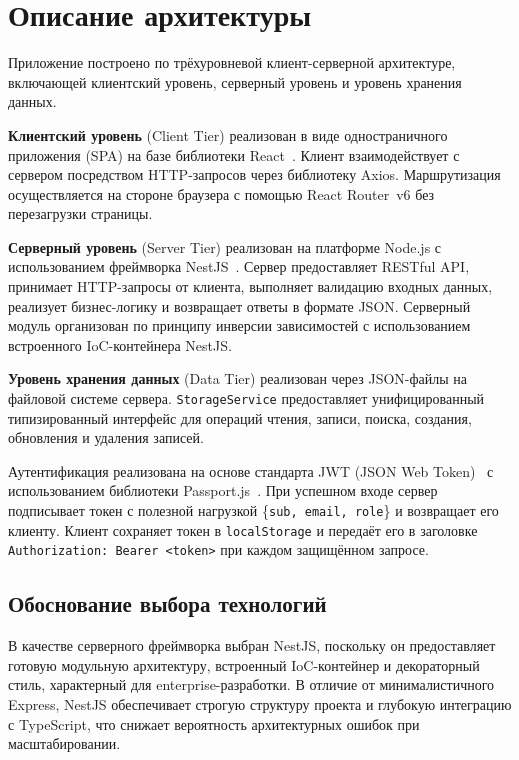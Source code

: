 \documentclass[14pt,a4paper]{extarticle}
\begin{document}
\newpage

\section{Описание архитектуры}

Приложение построено по трёхуровневой клиент-серверной архитектуре, включающей клиентский уровень, серверный уровень и уровень хранения данных.

\textbf{Клиентский уровень} (Client Tier) реализован в виде одностраничного приложения (SPA) на базе библиотеки React~\cite{react}. Клиент взаимодействует с сервером посредством HTTP-запросов через библиотеку Axios. Маршрутизация осуществляется на стороне браузера с помощью React Router~v6 без перезагрузки страницы.

\textbf{Серверный уровень} (Server Tier) реализован на платформе Node.js с использованием фреймворка NestJS~\cite{nestjs}. Сервер предоставляет RESTful API, принимает HTTP-запросы от клиента, выполняет валидацию входных данных, реализует бизнес-логику и возвращает ответы в формате JSON. Серверный модуль организован по принципу инверсии зависимостей с использованием встроенного IoC-контейнера NestJS.

\textbf{Уровень хранения данных} (Data Tier) реализован через JSON-файлы на файловой системе сервера. \texttt{StorageService} предоставляет унифицированный типизированный интерфейс для операций чтения, записи, поиска, создания, обновления и удаления записей.

Аутентификация реализована на основе стандарта JWT (JSON Web Token)~\cite{jwt} с использованием библиотеки Passport.js~\cite{passport}. При успешном входе сервер подписывает токен с полезной нагрузкой \{\texttt{sub, email, role}\} и возвращает его клиенту. Клиент сохраняет токен в \texttt{localStorage} и передаёт его в заголовке \texttt{Authorization: Bearer <token>} при каждом защищённом запросе.

\subsection{Обоснование выбора технологий}

В качестве серверного фреймворка выбран NestJS, поскольку он предоставляет готовую модульную архитектуру, встроенный IoC-контейнер и декораторный стиль, характерный для enterprise-разработки. В отличие от минималистичного Express, NestJS обеспечивает строгую структуру проекта и глубокую интеграцию с TypeScript, что снижает вероятность архитектурных ошибок при масштабировании.
\end{document}
